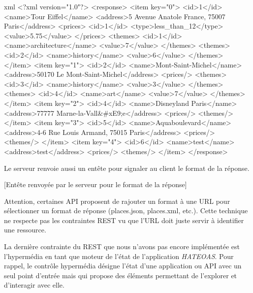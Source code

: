 \documentclass[big]{zmdocument}
\begin{document}
\begin{CodeBlock}{xml}
<?xml version="1.0"?>
<response>
    <item key="0">
        <id>1</id>
        <name>Tour Eiffel</name>
        <address>5 Avenue Anatole France, 75007 Paris</address>
        <prices>
            <id>1</id>
            <type>less_than_12</type>
            <value>5.75</value>
        </prices>
        <themes>
            <id>1</id>
            <name>architecture</name>
            <value>7</value>
        </themes>
        <themes>
            <id>2</id>
            <name>history</name>
            <value>6</value>
        </themes>
    </item>
    <item key="1">
        <id>2</id>
        <name>Mont-Saint-Michel</name>
        <address>50170 Le Mont-Saint-Michel</address>
        <prices/>
        <themes>
            <id>3</id>
            <name>history</name>
            <value>3</value>
        </themes>
        <themes>
            <id>4</id>
            <name>art</name>
            <value>7</value>
        </themes>
    </item>
    <item key="2">
        <id>4</id>
        <name>Disneyland Paris</name>
        <address>77777 Marne-la-Vall&#xE9;e</address>
        <prices/>
        <themes/>
    </item>
    <item key="3">
        <id>5</id>
        <name>Aquaboulevard</name>
        <address>4-6 Rue Louis Armand, 75015 Paris</address>
        <prices/>
        <themes/>
    </item>
    <item key="4">
        <id>6</id>
        <name>test</name>
        <address>test</address>
        <prices/>
        <themes/>
    </item>
</response>
\end{CodeBlock}



Le serveur renvoie aussi un entête  pour signaler au client le format de la réponse.



[Entête renvoyée par le serveur pour le format de la réponse]


\begin{Warning}
Attention, certaines API proposent de rajouter un format à une URL pour sélectionner un format de réponse (places.json, places.xml, etc.). Cette technique ne respecte pas les contraintes REST vu que l'URL doit juste servir à identifier une ressource.
\end{Warning}




La dernière contrainte du REST que nous n'avons pas encore implémentée est 
l'hypermédia en tant que moteur de l'état de l'application \textit{HATEOAS}. 
Pour rappel, le contrôle hypermédia désigne l'état d'une application ou API avec un seul point d'entrée mais qui propose des éléments permettant de l'explorer et d'interagir avec elle.
\end{document}
